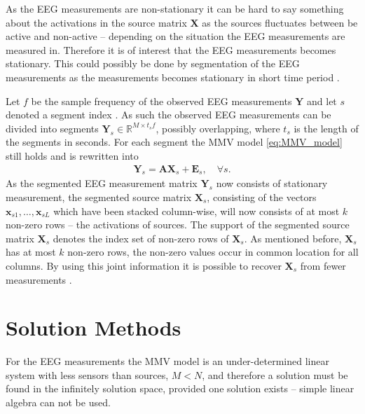 As the EEG measurements are non-stationary it can be hard to say something about the activations in the source matrix $\mathbf{X}$ as the sources fluctuates between be active and non-active -- depending on the situation the EEG measurements are measured in.
Therefore it is of interest that the EEG measurements becomes stationary.
This could possibly be done by segmentation of the EEG measurements as the measurements becomes stationary in short time period .

Let $f$ be the sample frequency of the observed EEG measurements $\mathbf{Y}$ and let $s$ denoted a segment index .
As such the observed EEG measurements can be divided into segments $\mathbf{Y}_s \in \mathbb{R}^{M \times t_s f}$, possibly overlapping, where $t_s$ is the length of the segments in seconds. For each segment the MMV model \eqref{eq:MMV_model} still holds and is rewritten into
\begin{align}\label{eq:MMV_seg}
\mathbf{Y}_s = \mathbf{AX}_s + \textbf{E}_s, \quad \forall s.
\end{align}
As the segmented EEG measurement matrix $\mathbf{Y}_s$ now consists of stationary measurement, the segmented source matrix $\mathbf{X}_s$, consisting of the vectors $\mathbf{x}_{s1}, \dots, \mathbf{x}_{sL}$ which have been stacked column-wise, will now consists of at most $k$ non-zero rows -- the activations of sources. 
The support of the segmented source matrix $\mathbf{X}_s$ denotes the index set of non-zero rows of $\mathbf{X}_s$. 
As mentioned before, $\mathbf{X}_s$ has at most $k$ non-zero rows, the non-zero values occur in common location for all columns. 
By using this joint information it is possible to recover $\mathbf{X}_s$ from fewer measurements \cite[p. 43]{CS}.

\section{Solution Methods}
For the EEG measurements the MMV model is an under-determined linear system with less sensors than sources, $M < N$, and therefore a solution must be found in the infinitely solution space, provided one solution exists -- simple linear algebra can not be used.

